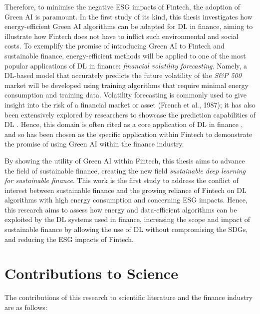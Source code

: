 \documentclass[a4paper, 11pt]{report}
\begin{document}
    Therefore, to minimise the negative ESG impacts of Fintech, the adoption of Green AI is paramount. In the first study of its kind, this thesis investigates how energy-efficient Green AI algorithms can be adapted for DL in finance, aiming to illustrate how Fintech does not have to inflict such environmental and social costs. To exemplify the promise of introducing Green AI to Fintech and sustainable finance, energy-efficient methods will be applied to one of the most popular applications of DL in finance: \emph{financial volatility forecasting}. Namely, a DL-based model that accurately predicts the future volatility of the \emph{S\&P 500} market will be developed using training algorithms that require minimal energy consumption and training data. Volatility forecasting is commonly used to give insight into the risk of a financial market or asset (French et al., 1987); it has also been extensively explored by researchers to showcase the prediction capabilities of DL \citep{zhang-2022}. Hence, this domain is often cited as a core application of DL in finance \citep{thakkar-2021}, and so has been chosen as the specific application within Fintech to demonstrate the promise of using Green AI within the finance industry.

    By showing the utility of Green AI within Fintech, this thesis aims to advance the field of sustainable finance, creating the new field \emph{sustainable deep learning for sustainable finance}. This work is the first study to address the conflict of interest between sustainable finance and the growing reliance of Fintech on DL algorithms with high energy consumption and concerning ESG impacts. Hence, this research aims to assess how energy and data-efficient algorithms can be exploited by the DL systems used in finance, increasing the scope and impact of sustainable finance by allowing the use of DL without compromising the SDGs, and reducing the ESG impacts of Fintech.


    \section{Contributions to Science}
    \label{section: contributions}

    The contributions of this research to scientific literature and the finance industry are as follows:
\end{document}

